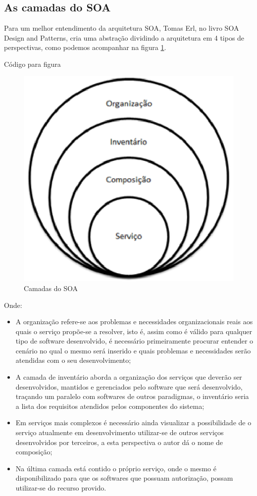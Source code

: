 \documentclass[12pt]{article}
\begin{document}
\subsection{As camadas do SOA}

Para um melhor entendimento da arquitetura SOA, Tomas Erl, no livro SOA Design and Patterns, cria uma abstração dividindo a arquitetura em 4 tipos de perspectivas, como podemos acompanhar na figura \ref{fig:1}.

 Código para figura
\clearpage
\begin{figure}[H]
\centering
\includegraphics[width=14cm]{fig1.eps}
\caption{Camadas do SOA}
\label{fig:1}
\end{figure}

Onde:

\begin{itemize}
	\item A organização refere-se aos problemas e necessidades organizacionais reais aos quais o serviço propõe-se a resolver, isto é, assim como é válido para qualquer tipo de software desenvolvido, é necessário primeiramente procurar entender o cenário no qual o mesmo será inserido e quais problemas e necessidades serão atendidas com o seu desenvolvimento;
	\item A camada de inventário aborda a organização dos serviços que deverão ser desenvolvidos, mantidos e gerenciados pelo software que será desenvolvido, traçando um paralelo com softwares de outros paradigmas, o inventário seria a lista dos requisitos atendidos pelos componentes do sistema;
	\item Em serviços mais complexos é necessário ainda visualizar a possibilidade de o serviço atualmente em desenvolvimento utilizar-se de outros serviços desenvolvidos por terceiros, a esta perspectiva o autor dá o nome de composição;
	\item Na última camada está contido o próprio serviço, onde o mesmo é disponibilizado para que os softwares que possuam autorização, possam utilizar-se  do recurso provido.
\end{itemize}
\end{document}
